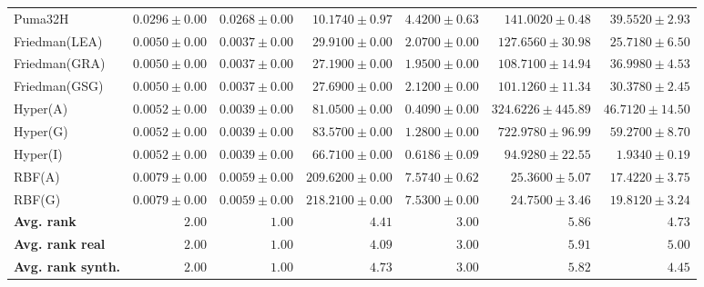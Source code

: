 \begin{table*}[!htbp]
{\begin{tabular}{lrrrrrr}
		Puma32H & $0.0296 \pm 0.00$ & $\mathbf{0.0268 \pm 0.00}$ & $10.1740 \pm 0.97$ & $4.4200 \pm 0.63$ & $141.0020 \pm 0.48$ & $39.5520 \pm 2.93$\\
		Friedman(LEA) & $0.0050 \pm 0.00$ & $\mathbf{0.0037 \pm 0.00}$ & $29.9100 \pm 0.00$ & $2.0700 \pm 0.00$ & $127.6560 \pm 30.98$ & $25.7180 \pm 6.50$\\
		Friedman(GRA) & $0.0050 \pm 0.00$ & $\mathbf{0.0037 \pm 0.00}$ & $27.1900 \pm 0.00$ & $1.9500 \pm 0.00$ & $108.7100 \pm 14.94$ & $36.9980 \pm 4.53$\\
		Friedman(GSG) & $0.0050 \pm 0.00$ & $\mathbf{0.0037 \pm 0.00}$ & $27.6900 \pm 0.00$ & $2.1200 \pm 0.00$ & $101.1260 \pm 11.34$ & $30.3780 \pm 2.45$\\
		Hyper(A) & $0.0052 \pm 0.00$ & $\mathbf{0.0039 \pm 0.00}$ & $81.0500 \pm 0.00$ & $0.4090 \pm 0.00$ & $324.6226 \pm 445.89$ & $46.7120 \pm 14.50$\\
		Hyper(G) & $0.0052 \pm 0.00$ & $\mathbf{0.0039 \pm 0.00}$ & $83.5700 \pm 0.00$ & $1.2800 \pm 0.00$ & $722.9780 \pm 96.99$ & $59.2700 \pm 8.70$\\
		Hyper(I) & $0.0052 \pm 0.00$ & $\mathbf{0.0039 \pm 0.00}$ & $66.7100 \pm 0.00$ & $0.6186 \pm 0.09$ & $94.9280 \pm 22.55$ & $1.9340 \pm 0.19$\\
		RBF(A) & $0.0079 \pm 0.00$ & $\mathbf{0.0059 \pm 0.00}$ & $209.6200 \pm 0.00$ & $7.5740 \pm 0.62$ & $25.3600 \pm 5.07$ & $17.4220 \pm 3.75$\\
		RBF(G) & $0.0079 \pm 0.00$ & $\mathbf{0.0059 \pm 0.00}$ & $218.2100 \pm 0.00$ & $7.5300 \pm 0.00$ & $24.7500 \pm 3.46$ & $19.8120 \pm 3.24$\\
		\midrule
		\textbf{{Avg. rank}} & $2.00$ & $\mathbf{1.00}$ & $4.41$ & $3.00$ & $5.86$ & $4.73$\\
		\textbf{{Avg. rank real}} & $2.00$ & $\mathbf{1.00}$ & $4.09$ & $3.00$ & $5.91$ & $5.00$\\
		\textbf{{Avg. rank synth.}} & $2.00$ & $\mathbf{1.00}$ & $4.73$ & $3.00$ & $5.82$ & $4.45$\\
		\bottomrule
	\end{tabular}}
\end{table*}
